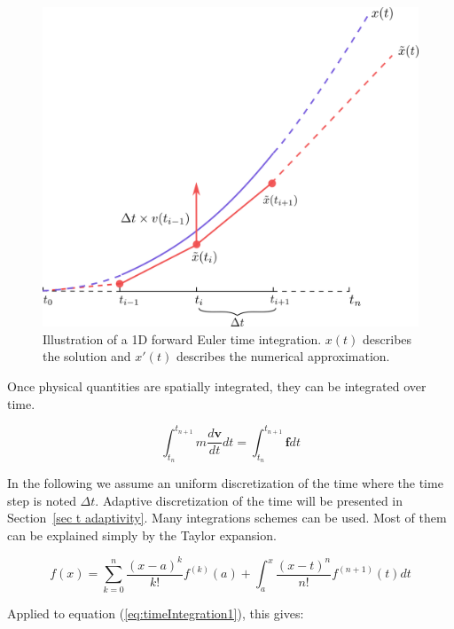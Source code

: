 \begin{figure}[!ht]
\centering
\includegraphics[scale=0.6]{images/continuum_mechanics/timeIntegration.png}
\caption[STAR mechanics: Temporal integration]{\label{fig:timeIntegration} 
	Illustration of a 1D forward Euler time integration. 
	$x(t)$ describes the solution and $x'(t)$ describes the numerical approximation.}
\end{figure}

Once physical quantities are spatially integrated, they can be integrated over time. 

\begin{equation}
\label{eq:timeIntegration1}
\displaystyle
\int_{t_{n}}^{t_{n+1}}
m \frac{d\mathbf{v}}{dt} dt
=
\int_{t_{n}}^{t_{n+1}}\mathbf{f} dt
\end{equation}

In the following we assume an uniform discretization of the time where the time step is noted $\Delta t$.
Adaptive discretization of the time will be presented in Section~\ref{sec t adaptivity}.
Many integrations schemes can be used. 
Most of them can be explained simply by the Taylor expansion.

\begin{equation}
\label{eq:taylorExpansion}
\displaystyle
f(x) = \sum_{k=0}^{n}\frac{\left(x-a\right)^{k}}{k!}f^{(k)}(a) + \int_{a}^{x}\frac{\left(x-t\right)^{n}}{n!}f^{(n+1)}(t)dt
\end{equation}

Applied to equation (\ref{eq:timeIntegration1}), this gives:

